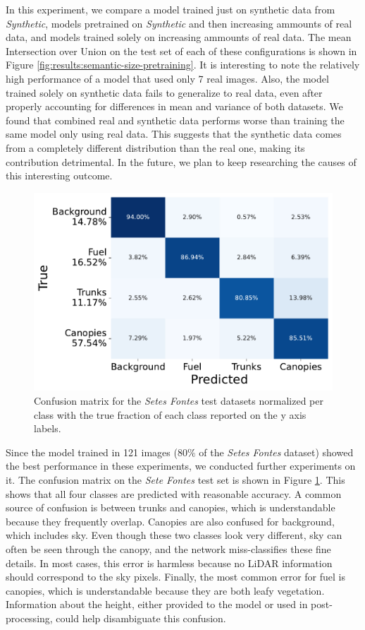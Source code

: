 In this experiment, we compare a model trained just on synthetic data from \textit{Synthetic}, models pretrained on \textit{Synthetic} and then increasing ammounts of real data, and models trained solely on increasing ammounts of real data. The mean Intersection over Union on the test set of each of these configurations is shown in Figure \ref{fig:results:semantic-size-pretraining}.
It is interesting to note the relatively high performance of a model that used only 7 real images. Also, the model trained solely on synthetic data fails to generalize to real data, even after properly accounting for differences in mean and variance of both datasets. We found that combined real and synthetic data performs worse than training the same model only using real data. This suggests that the synthetic data comes from a completely different distribution than the real one, making its contribution detrimental. In the future, we plan to keep researching the causes of this interesting outcome.
\begin{figure}
    \centering
    \includegraphics[width=0.7\columnwidth]{figs/results/semantic_segmentation/confusion_matrix.pdf} 
    \caption{Confusion matrix for the \textit{Setes Fontes} test datasets normalized per class with the true fraction of each class reported on the y axis labels.
    }
    \label{fig:results:sete_fontes_confusion_matrix}
\end{figure}

Since the model trained in 121 images ($80\%$ of the \textit{Setes Fontes} dataset) showed the best performance in these experiments, we conducted further experiments on it. The confusion matrix on the \textit{Sete Fontes} test set is shown in Figure \ref{fig:results:sete_fontes_confusion_matrix}. This shows that all four classes are predicted with reasonable accuracy. A common source of confusion is between trunks and canopies, which is understandable because they frequently overlap. Canopies are also confused for background, which includes sky. Even though these two classes look very different, sky can often be seen through the canopy, and the network miss-classifies these fine details. In most cases, this error is harmless because no LiDAR information should correspond to the sky pixels. Finally, the most common error for fuel is canopies, which is understandable because they are both leafy vegetation. Information about the height, either provided to the model or used in post-processing, could help disambiguate this confusion. 

